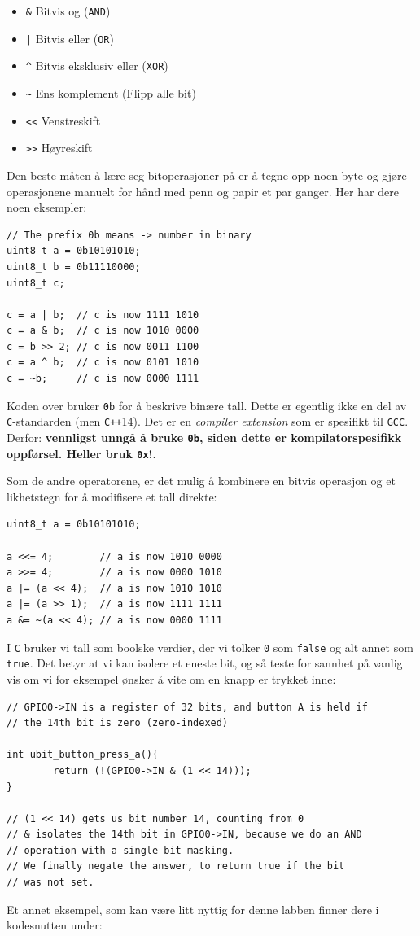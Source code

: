 \begin{itemize}
    \item \verb|&| Bitvis og (\verb|AND|)
    \item \texttt{|} Bitvis eller (\verb|OR|)
    \item \verb|^| Bitvis eksklusiv eller (\verb|XOR|)
    \item \verb|~| Ens komplement (Flipp alle bit)
    \item \verb|<<| Venstreskift
    \item \verb|>>| Høyreskift
\end{itemize}


Den beste måten å lære seg bitoperasjoner på er å tegne opp noen byte og gjøre operasjonene manuelt for hånd med penn og papir et par ganger. Her har dere noen eksempler:


\begin{lstlisting}
// The prefix 0b means -> number in binary
uint8_t a = 0b10101010;
uint8_t b = 0b11110000;
uint8_t c;

c = a | b;  // c is now 1111 1010
c = a & b;  // c is now 1010 0000
c = b >> 2; // c is now 0011 1100
c = a ^ b;  // c is now 0101 1010
c = ~b;     // c is now 0000 1111
\end{lstlisting}
Koden over bruker \verb|0b| for å beskrive binære tall. Dette er egentlig ikke en del av \verb|C|-standarden (men \verb|C++|14). Det er en \textit{compiler extension} som er spesifikt til \verb|GCC|. Derfor: \textcolor{RWTHrot100}{\textbf{vennligst unngå å bruke \texttt{0b}, siden dette er kompilatorspesifikk oppførsel. Heller bruk \texttt{0x}!}.}


Som de andre operatorene, er det mulig å kombinere en bitvis operasjon og
et likhetstegn for å modifisere et tall direkte:
\begin{lstlisting}
uint8_t a = 0b10101010;

a <<= 4;        // a is now 1010 0000
a >>= 4;        // a is now 0000 1010
a |= (a << 4);  // a is now 1010 1010
a |= (a >> 1);  // a is now 1111 1111
a &= ~(a << 4); // a is now 0000 1111
\end{lstlisting}

I \verb|C| bruker vi tall som boolske verdier, der vi tolker \verb|0| som \verb|false| og alt annet som \verb|true|. Det betyr at vi kan isolere et eneste bit, og så teste for
sannhet på vanlig vis om vi for eksempel ønsker å vite om en knapp er trykket
inne:

\begin{lstlisting}
// GPIO0->IN is a register of 32 bits, and button A is held if
// the 14th bit is zero (zero-indexed)

int ubit_button_press_a(){
        return (!(GPIO0->IN & (1 << 14)));
}

// (1 << 14) gets us bit number 14, counting from 0
// & isolates the 14th bit in GPIO0->IN, because we do an AND
// operation with a single bit masking.
// We finally negate the answer, to return true if the bit
// was not set.
\end{lstlisting}
Et annet eksempel, som kan være litt nyttig for denne labben finner dere i kodesnutten under:

